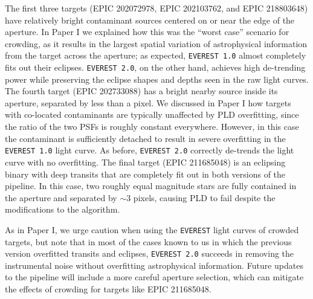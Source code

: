 \documentclass[]{emulateapj}
\begin{document}
The first three targets (EPIC 202072978, EPIC 202103762, and EPIC 218803648) have relatively bright
contaminant sources centered on or near the edge of the aperture. In Paper I we explained how this
was the ``worst case'' scenario for crowding, as it results in the largest spatial variation of
astrophysical information from the target across the aperture; as expected, \texttt{EVEREST 1.0}
almost completely fits out their eclipses. \texttt{EVEREST 2.0}, on the other hand, achieves high
de-trending power while preserving the eclipse shapes and depths seen in the raw light curves.
The fourth target (EPIC 202733088) has a bright nearby source inside its aperture, separated by
less than a pixel. We discussed in Paper I how targets with co-located contaminants are typically
unaffected by PLD overfitting, since the ratio of the two PSFs is roughly constant everywhere.
However, in this case the contaminant is sufficiently detached to result in severe overfitting
in the \texttt{EVEREST 1.0} light curve. As before, \texttt{EVEREST 2.0} correctly de-trends the light curve with
no overfitting. The final target (EPIC 211685048) is an eclipsing binary with deep transits that are completely
fit out in both versions of the pipeline. In this case, two roughly equal magnitude stars are
fully contained in the aperture and separated by ${\sim}3$ pixels, causing PLD to fail despite
the modifications to the algorithm.

As in Paper I, we urge caution when using the \texttt{EVEREST} light curves of crowded targets,
but note that in most of the cases known to us in which the previous version overfitted transits
and eclipses, \texttt{EVEREST 2.0} succeeds in removing the instrumental noise without overfitting
astrophysical information. Future updates to the pipeline will include a more careful aperture
selection, which can mitigate the effects of crowding for targets like EPIC 211685048.
\end{document}
